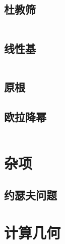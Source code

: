 \documentclass[a4paper,11pt]{article}
\begin{document}
\subsection{杜教筛}
\inputminted[breaklines]{c++}{Math/杜教筛.cpp}

\subsection{线性基}
\inputminted[breaklines]{c++}{Math/线性基.cpp}

\subsection{原根}


\subsection{欧拉降幂}
\inputminted[breaklines]{c++}{Math/欧拉降幂.cpp}



\newpage
\section{杂项}

\subsection{约瑟夫问题}











\newpage
\section{计算几何}







\end{document}
